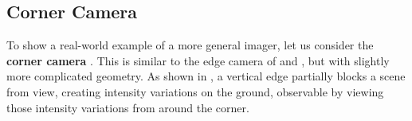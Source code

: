 




\subsection{Corner Camera}  

To show a real-world example of a more general imager, let us consider the {\bf corner camera} \cite{Bouman17}.  This is similar to the edge
camera of \eqn{\ref{eq:edge}} and \fig{\ref{fig:amats3}}, but with
slightly more complicated geometry.  As shown in
, a vertical edge partially blocks a scene from view, creating intensity variations on the ground, observable by viewing those intensity variations from around the corner.


